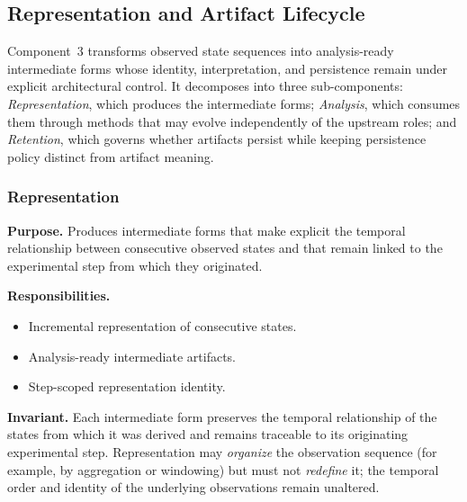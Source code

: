 \subsection{Representation and Artifact Lifecycle}
Component~3 transforms observed state sequences into analysis-ready intermediate forms whose identity, interpretation, and persistence remain under explicit architectural control. It decomposes into three sub-components: \emph{Representation}, which produces the intermediate forms; \emph{Analysis}, which consumes them through methods that may evolve independently of the upstream roles; and \emph{Retention}, which governs whether artifacts persist while keeping persistence policy distinct from artifact meaning.

  \subsubsection{Representation}
  \textbf{Purpose.} Produces intermediate forms that make explicit the temporal relationship between consecutive observed states and that remain linked to the experimental step from which they originated.

  \textbf{Responsibilities.}
  \begin{itemize}
    \item Incremental representation of consecutive states.
    \item Analysis-ready intermediate artifacts.
    \item Step-scoped representation identity.
  \end{itemize}

  \textbf{Invariant.} Each intermediate form preserves the temporal relationship of the states from which it was derived and remains traceable to its originating experimental step. Representation may \emph{organize} the observation sequence (for example, by aggregation or windowing) but must not \emph{redefine} it; the temporal order and identity of the underlying observations remain unaltered.

